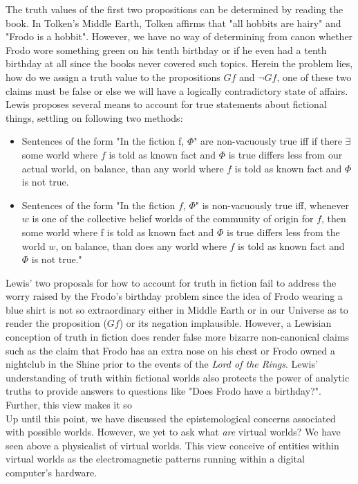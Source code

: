 The truth values of the first two propositions can be determined by reading the book. In Tolken's Middle Earth, Tolken affirms that "all hobbits are hairy" and "Frodo is a hobbit". However, we have no way of determining from canon whether Frodo wore something green on his tenth birthday or if he even had a tenth birthday at all since the books never covered such topics. Herein the problem lies, how do we assign a truth value to the propositions $Gf$ and $\neg Gf$, one of these two claims must be false or else we will have a logically contradictory state of affairs. 
	 Lewis proposes several means to account for true statements about fictional things, settling on following two methods: 
 \begin{itemize}
	\item Sentences of the form "In the fiction f, $\Phi$" are non-vacuously true iff if there $\exists$ some
world where $f$ is told as known fact and $\Phi$ is true differs less from our actual world, on
balance, than any world where $f$ is told as known fact and $\Phi$ is not true. \cite{Lewis1978-LEWTIF}
\item Sentences of the form "In the fiction $f$, $\Phi$" is non-vacuously true iff,
whenever $w$ is one of the collective belief worlds of the community of origin for $f$, then
some world where f is told as known fact and $\Phi$ is true differs less from the world $w$, on
balance, than does any world where $f$ is told as known fact and $\Phi$ is not true." \cite{Lewis1978-LEWTIF}
\end{itemize}
Lewis' two proposals for how to account for truth in fiction fail to address the worry raised by the Frodo's birthday problem since the idea of Frodo wearing a blue shirt is not so extraordinary either in Middle Earth or in our Universe as to render the proposition ($Gf$) or its negation implausible. However, a Lewisian conception of truth in fiction does render false more bizarre non-canonical claims such as the claim that Frodo has an extra nose on his chest or Frodo owned a nightclub in the Shine prior to the events of the \textit{Lord of the Rings}. Lewis' understanding of truth within fictional worlds also protects the power of analytic truths to provide answers to questions like "Does Frodo have a birthday?". Further, this view makes it so 
\\
Up until this point, we have discussed the epistemological concerns associated with possible worlds. However, we yet to ask what \textit{are} virtual worlds? We have seen above a physicalist of virtual worlds. This view conceive of entities within virtual worlds as the electromagnetic patterns running within a digital computer's hardware. 
